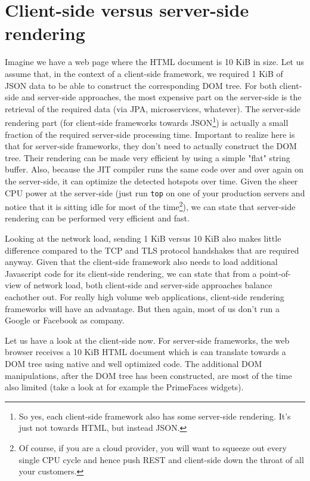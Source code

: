 \section{Client-side versus server-side rendering}
Imagine we have a web page where the HTML document is 10 KiB in size.
Let us assume that, in the context of a client-side framework, we required 1 KiB of JSON data to be able to construct the corresponding DOM tree.
For both client-side and server-side approaches, the most expensive part on the server-side is the retrieval of the required data (via JPA, microservices, whatever).
The server-side rendering part (for client-side frameworks towards JSON\footnote{So yes, each client-side framework also has some server-side rendering. It's just not towards HTML, but instead JSON.}) is actually a small fraction of the required server-side processing time.
Important to realize here is that for server-side frameworks, they don't need to actually construct the DOM tree.
Their rendering can be made very efficient by using a simple "flat" string buffer.
Also, because the JIT compiler runs the same code over and over again on the server-side, it can optimize the detected hotspots over time.
Given the sheer CPU power at the server-side (just run \texttt{top} on one of your production servers and notice that it is sitting idle for most of the time\footnote{Of course, if you are a cloud provider, you will want to squeeze out every single CPU cycle and hence push REST and client-side down the throat of all your customers.}), we can state that server-side rendering can be performed very efficient and fast.

Looking at the network load, sending 1 KiB versus 10 KiB also makes little difference compared to the TCP and TLS protocol handshakes that are required anyway.
Given that the client-side framework also needs to load additional Javascript code for its client-side rendering,
we can state that from a point-of-view of network load, both client-side and server-side approaches balance eachother out.
For really high volume web applications, client-side rendering frameworks will have an advantage.
But then again, most of us don't run a Google or Facebook as company.

Let us have a look at the client-side now.
For server-side frameworks, the web browser receives a 10 KiB HTML document which is can translate towards a DOM tree using native and well optimized code.
The additional DOM manipulations, after the DOM tree has been constructed, are most of the time also limited (take a look at for example the PrimeFaces widgets).

